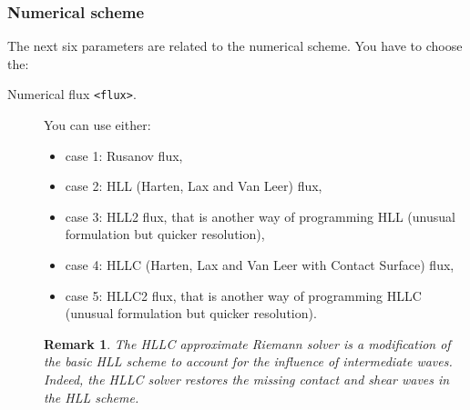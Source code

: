 \documentclass[a4paper, 11pt]{article}
\newtheorem{rmk}{Remark}
\begin{document}
\subsubsection{Numerical scheme}
The next six parameters are related to the numerical scheme. You have to choose the:
\begin{description}
	\item[Numerical flux \texttt{<flux>}.] You can use either:
		\begin{itemize}
			\item case 1: Rusanov flux,
			\item case 2: HLL (Harten, Lax and Van Leer) flux,
			\item case 3: HLL2 flux, that is another way of programming HLL (unusual formulation but quicker resolution),
                        \item case 4: HLLC (Harten, Lax and Van Leer with Contact Surface) flux,
			\item case 5: HLLC2 flux, that is another way of programming HLLC (unusual formulation but quicker resolution).

		\end{itemize}
                \begin{rmk}
                  The HLLC approximate Riemann solver is a modification of the basic HLL scheme to account for the influence of intermediate waves. Indeed, the HLLC solver restores the missing contact and shear waves in the HLL scheme.                  
                \end{rmk}


\end{description}
\end{document}
